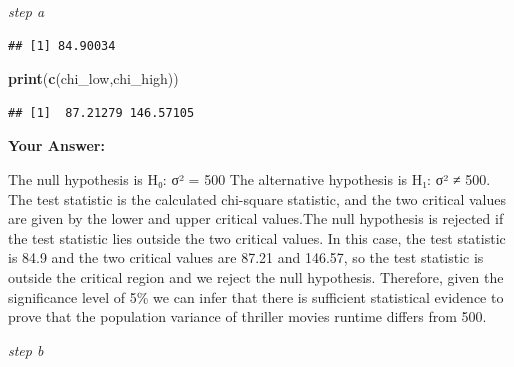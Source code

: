 \documentclass[
]{article}
\newenvironment{Shaded}{\begin{snugshade}}{\end{snugshade}}
\newcommand{\DecValTok}[1]{\textcolor[rgb]{0.00,0.00,0.81}{#1}}
\newcommand{\FloatTok}[1]{\textcolor[rgb]{0.00,0.00,0.81}{#1}}
\newcommand{\FunctionTok}[1]{\textcolor[rgb]{0.13,0.29,0.53}{\textbf{#1}}}
\newcommand{\NormalTok}[1]{#1}
\newcommand{\OtherTok}[1]{\textcolor[rgb]{0.56,0.35,0.01}{#1}}
\newcommand{\SpecialCharTok}[1]{\textcolor[rgb]{0.81,0.36,0.00}{\textbf{#1}}}
\begin{document}
\emph{step a}

\begin{Shaded}
\end{Shaded}

\begin{verbatim}
## [1] 84.90034
\end{verbatim}

\begin{Shaded}
\begin{Highlighting}[]
\FunctionTok{print}\NormalTok{(}\FunctionTok{c}\NormalTok{(chi\_low,chi\_high))}
\end{Highlighting}
\end{Shaded}

\begin{verbatim}
## [1]  87.21279 146.57105
\end{verbatim}

\textbf{Your Answer:}

The null hypothesis is H₀: σ² = 500 The alternative hypothesis is H₁: σ²
≠ 500. The test statistic is the calculated chi-square statistic, and
the two critical values are given by the lower and upper critical
values.The null hypothesis is rejected if the test statistic lies
outside the two critical values. In this case, the test statistic is
84.9 and the two critical values are 87.21 and 146.57, so the test
statistic is outside the critical region and we reject the null
hypothesis. Therefore, given the significance level of 5\% we can infer
that there is sufficient statistical evidence to prove that the
population variance of thriller movies runtime differs from 500.

\emph{step b}
\end{document}
